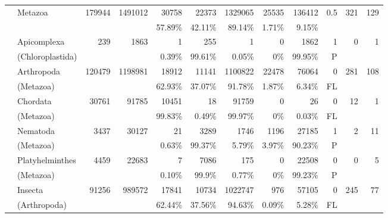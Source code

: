 \begin{table}
\begin{center}
\begin{tabular}{|>{\scriptsize}c|>{\scriptsize}l|>{\scriptsize}r|>{\scriptsize}r||>{\scriptsize}r|>{\scriptsize}r||>{\scriptsize}r|>{\scriptsize}r|>{\scriptsize}r||>{\scriptsize}r|>{\scriptsize}r|>{\scriptsize}r| }
            & Metazoa & 179944 & 1491012        & 30758 & 22373     & 1329065 & 25535 & 136412    & 0.5 & 321 & 129 \\
            & & &                               & 57.89\% & 42.11\% & 89.14\% & 1.71\% & 9.15\%   & & & \\
            \hline \hline
            \parbox[c]{1mm}{}
            & Apicomplexa & 239 & 1863          & 1 & 255           & 1 & 0 & 1862                & 1 & 0 & 1 \\
            & {\tiny (Chloroplastida)\par} & &  & 0.39\% & 99.61\%  & 0.05\% & 0\% & 99.95\%      & P & & \\ 
            & Arthropoda & 120479 & 1198981     & 18912 & 11141     & 1100822 & 22478 & 76064     & 0 & 281 & 108 \\
            & {\tiny (Metazoa)\par} & &         & 62.93\% & 37.07\% & 91.78\% & 1.87\% & 6.34\%   & FL & & \\ 
            & Chordata & 30761 & 91785          & 10451 & 18        & 91759 & 0 & 26              & 0 & 12 & 1 \\
            & {\tiny (Metazoa)\par} & &         & 99.83\% & 0.49\%  & 99.97\% & 0\% & 0.03\%      & FL & & \\ 
            & Nematoda & 3437 & 30127           & 21 & 3289         & 1746 & 1196 & 27185         & 1 & 2 & 11 \\
            & {\tiny (Metazoa)\par} & &         & 0.63\% & 99.37\%  & 5.79\% & 3.97\% & 90.23\%   & P & & \\ 
            & Platyhelminthes & 4459 & 22683    & 7 & 7086          & 175 & 0 & 22508             & 0 & 0 & 5 \\
            & {\tiny (Metazoa)\par} & &         & 0.10\% & 99.9\%   & 0.77\% & 0\% & 99.23\%      & P & & \\
            \hline \hline 
            \parbox[c]{1mm}{}
            & Insecta & 91256 & 989572          & 17841 & 10734     & 1022747 & 976 & 57105       & 0 & 245 & 77 \\
            & {\tiny (Arthropoda)\par} & &      & 62.44\% & 37.56\% & 94.63\% & 0.09\% & 5.28\%   & FL & & \\ 

\end{tabular}
\end{center}
\end{table}
